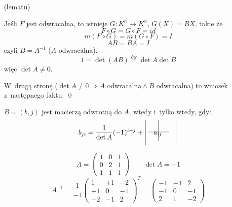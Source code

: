 \begin{dd}
  (lematu)

  Jeśli $F$ jest odwracalna, to istnieje $G: K^n \rightarrow K^n$, $G(X)=BX$,
  takie że
  \[F \circ G = G \circ F = id\]
  \[m(F \circ G) = m(G \circ F) = I\]
  \[AB = BA = I\]
  czyli $B=A^{-1}$ ($A$ odwracalna).
  \[1 = \det (AB) \overset{\text{ćw}} = \det A \det B\]
  więc $\det A \neq 0$.

  W~drugą stronę ($\det A \neq 0 \Rightarrow A \text{ odwracalna} \land B \text{ odwracalna}$) to wniosek z~następnego faktu.
  \hfill \qed
\end{dd}
\begin{ft}
  $B = (b, j)$ jest macierzą odwrotną do $A$, wtedy i~tylko wtedy, gdy:
  \[b_{ji} = \frac1{\det A}(-1)^{i+j} +
  \begin{vmatrix}
  & & & \\ 
  & a_{ij} \makebox(-10,0){\rule[4mm]{0.4pt}{2.5\normalbaselineskip}} 
      \makebox(-10,0){\rule[2.5mm]{2.5\normalbaselineskip}{0.4pt}} 
  & \\ 
  & & &
  \end{vmatrix}
  \]
\end{ft}
\begin{prz}
  \[A = \begin{pmatrix}1&0&1\\0&2&1\\1&1&1\end{pmatrix}\qquad\det A = -1\]
  \[A^{-1}=\frac1{-1}\begin{pmatrix}1&+1&-2\\+1&0&-1\\-2&-1&2\end{pmatrix}^T
    =\begin{pmatrix}-1&-1&2\\-1&0&-1\\2&1&-2\end{pmatrix}\]
\end{prz}
